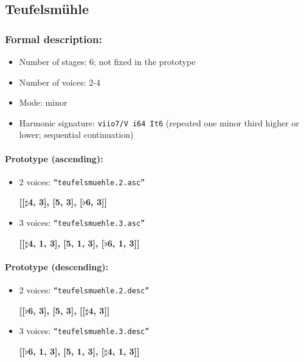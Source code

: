 ﻿\documentclass[11pt, openany]{article}
\begin{document}
\begin{itemize}
	\subsection{Teufelsm\"uhle}
	
\subsubsection{Formal description:}
\begin{itemize}
\item Number of stages: 6; not fixed in the prototype
\item Number of voices: 2-4
\item Mode: minor
\item Harmonic signature: \texttt{viio7/V i64 It6} (repeated one minor third higher or lower; sequential continuation)
\end{itemize}

\paragraph{Prototype (ascending):}
\begin{itemize}
\item 2 voices: \texttt{“teufelsmuehle.2.asc”}
	\begin{center}
	\textbf{[[$\sharp$4, 3], [5, 3], [$\flat$6, 3]]}
	\end{center}
\item 3 voices: \texttt{“teufelsmuehle.3.asc”}
	\begin{center}
	\textbf{[[$\sharp$4, 1, 3], [5, 1, 3], [$\flat$6, 1, 3]]}
	\end{center}
\end{itemize}

\paragraph{Prototype (descending):}
\begin{itemize}
\item 2 voices: \texttt{“teufelsmuehle.2.desc”}
	\begin{center}
	\textbf{[[$\flat$6, 3], [5, 3], [[$\sharp$4, 3]]}
	\end{center}
\item 3 voices: \texttt{“teufelsmuehle.3.desc”}
	\begin{center}
	\textbf{[[$\flat$6, 1, 3], [5, 1, 3], [$\sharp$4, 1, 3]]}
	\end{center}
\end{itemize}


\end{itemize}
\end{document}
